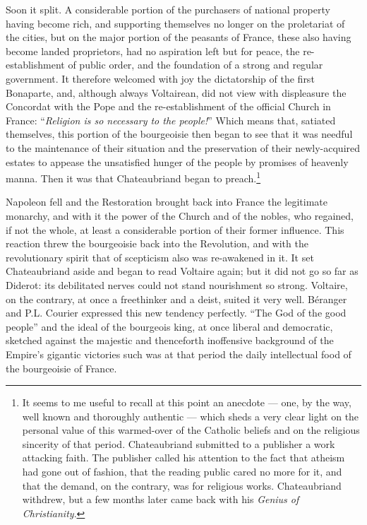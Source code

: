 \documentclass[12pt]{report}
\begin{document}
Soon it split. A considerable portion of the purchasers of national property having become rich, and supporting themselves no longer on the proletariat of the cities, but on the major portion of the peasants of France, these also having become landed proprietors, had no aspiration left but for peace, the re-establishment of public order, and the foundation of a strong and regular government. It therefore welcomed with joy the dictatorship of the first Bonaparte, and, although always Voltairean, did not view with displeasure the Concordat with the Pope and the re-establishment of the official Church in France: “\emph{Religion is so necessary to the people!}” Which means that, satiated themselves, this portion of the bourgeoisie then began to see that it was needful to the maintenance of their situation and the preservation of their newly-acquired estates to appease the unsatisfied hunger of the people by promises of heavenly manna. Then it was that Chateaubriand began to preach.\footnote{It seems to me useful to recall at this point an anecdote — one, by the way, well known and thoroughly authentic — which sheds a very clear light on the personal value of this warmed-over of the Catholic beliefs and on the religious sincerity of that period. Chateaubriand submitted to a publisher a work attacking faith. The publisher called his attention to the fact that atheism had gone out of fashion, that the reading public cared no more for it, and that the demand, on the contrary, was for religious works. Chateaubriand withdrew, but a few months later came back with his \emph{Genius of Christianity}.}


Napoleon fell and the Restoration brought back into France the legitimate monarchy, and with it the power of the Church and of the nobles, who regained, if not the whole, at least a considerable portion of their former influence. This reaction threw the bourgeoisie back into the Revolution, and with the revolutionary spirit that of scepticism also was re-awakened in it. It set Chateaubriand aside and began to read Voltaire again; but it did not go so far as Diderot: its debilitated nerves could not stand nourishment so strong. Voltaire, on the contrary, at once a freethinker and a deist, suited it very well. Béranger and P.L. Courier expressed this new tendency perfectly. “The God of the good people” and the ideal of the bourgeois king, at once liberal and democratic, sketched against the majestic and thenceforth inoffensive background of the Empire’s gigantic victories such was at that period the daily intellectual food of the bourgeoisie of France.
\end{document}
